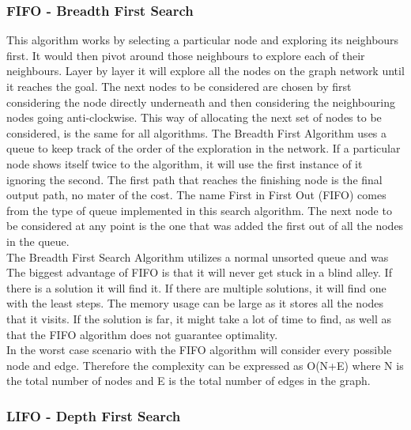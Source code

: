\documentclass[a4paper,12pt]{article}
\begin{document}
			\subsubsection{FIFO - Breadth First Search}

				This algorithm works by selecting a particular node and exploring its neighbours first. It would then pivot around those neighbours to explore each of their neighbours. Layer by layer it will explore all the nodes on the graph network until it reaches the goal. The next nodes to be considered are chosen by first considering the node directly underneath and then considering the neighbouring nodes going anti-clockwise. This way of allocating the next set of nodes to be considered, is the same for all algorithms. The Breadth First Algorithm uses a queue to keep track of the order of the exploration in the network. If a particular node shows itself twice to the algorithm, it will use the first instance of it ignoring the second. The first path that reaches the finishing node is the final output path, no mater of the cost. The name First in First Out (FIFO) comes from the type of queue implemented in this search algorithm. The next node to be considered at any point is the one that was added the first out of all the nodes in the queue.
				\\
				The Breadth First Search Algorithm utilizes a normal unsorted queue and was 
				\\
				The biggest advantage of FIFO is that it will never get stuck in a blind alley. If there is a solution it will find it. If there are multiple solutions, it will find one with the least steps. The memory usage can be large as it stores all the nodes that it visits. If the solution is far, it might take a lot of time to find, as well as that the FIFO algorithm does not guarantee optimality.
				\\
				In the worst case scenario with the FIFO algorithm will consider every possible node and edge. Therefore the complexity can be expressed as O(N+E) where N is the total number of nodes and E is the total number of edges in the graph. 
			
			\subsubsection{LIFO - Depth First Search}
			
\end{document}
